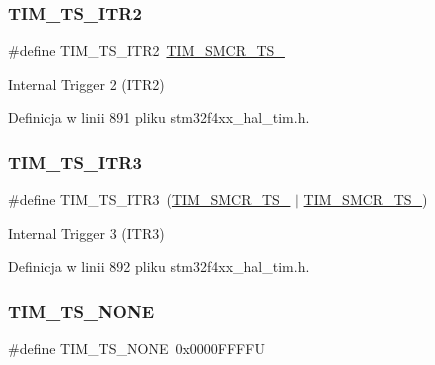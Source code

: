 \subsubsection{\texorpdfstring{T\+I\+M\+\_\+\+T\+S\+\_\+\+I\+T\+R2}{TIM\_TS\_ITR2}}
{\footnotesize\ttfamily \#define T\+I\+M\+\_\+\+T\+S\+\_\+\+I\+T\+R2~\hyperlink{group___peripheral___registers___bits___definition_gacb82212fcc89166a43ff97542da9182d}{T\+I\+M\+\_\+\+S\+M\+C\+R\+\_\+\+T\+S\+\_}}

Internal Trigger 2 (I\+T\+R2) 

Definicja w linii 891 pliku stm32f4xx\+\_\+hal\+\_\+tim.\+h.

\mbox{\label{group___t_i_m___trigger___selection_ga63183e611b91c5847040172c0069514d}} 
\subsubsection{\texorpdfstring{T\+I\+M\+\_\+\+T\+S\+\_\+\+I\+T\+R3}{TIM\_TS\_ITR3}}
{\footnotesize\ttfamily \#define T\+I\+M\+\_\+\+T\+S\+\_\+\+I\+T\+R3~(\hyperlink{group___peripheral___registers___bits___definition_ga8d1f040f9259acb3c2fba7b0c7eb3d96}{T\+I\+M\+\_\+\+S\+M\+C\+R\+\_\+\+T\+S\+\_} $\vert$ \hyperlink{group___peripheral___registers___bits___definition_gacb82212fcc89166a43ff97542da9182d}{T\+I\+M\+\_\+\+S\+M\+C\+R\+\_\+\+T\+S\+\_})}

Internal Trigger 3 (I\+T\+R3) 

Definicja w linii 892 pliku stm32f4xx\+\_\+hal\+\_\+tim.\+h.

\mbox{\label{group___t_i_m___trigger___selection_ga257bee9dc9f2f71a73124dd8c2329480}} 
\subsubsection{\texorpdfstring{T\+I\+M\+\_\+\+T\+S\+\_\+\+N\+O\+NE}{TIM\_TS\_NONE}}
{\footnotesize\ttfamily \#define T\+I\+M\+\_\+\+T\+S\+\_\+\+N\+O\+NE~0x0000\+F\+F\+F\+FU}

